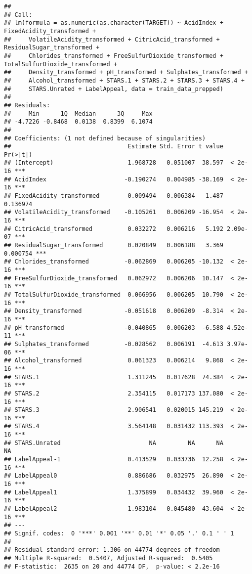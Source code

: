 \documentclass[
]{article}
\begin{document}
\begin{verbatim}
## 
## Call:
## lm(formula = as.numeric(as.character(TARGET)) ~ AcidIndex + FixedAcidity_transformed + 
##     VolatileAcidity_transformed + CitricAcid_transformed + ResidualSugar_transformed + 
##     Chlorides_transformed + FreeSulfurDioxide_transformed + TotalSulfurDioxide_transformed + 
##     Density_transformed + pH_transformed + Sulphates_transformed + 
##     Alcohol_transformed + STARS.1 + STARS.2 + STARS.3 + STARS.4 + 
##     STARS.Unrated + LabelAppeal, data = train_data_prepped)
## 
## Residuals:
##     Min      1Q  Median      3Q     Max 
## -4.7226 -0.8468  0.0138  0.8399  6.1074 
## 
## Coefficients: (1 not defined because of singularities)
##                                 Estimate Std. Error t value Pr(>|t|)    
## (Intercept)                     1.968728   0.051007  38.597  < 2e-16 ***
## AcidIndex                      -0.190274   0.004985 -38.169  < 2e-16 ***
## FixedAcidity_transformed        0.009494   0.006384   1.487 0.136974    
## VolatileAcidity_transformed    -0.105261   0.006209 -16.954  < 2e-16 ***
## CitricAcid_transformed          0.032272   0.006216   5.192 2.09e-07 ***
## ResidualSugar_transformed       0.020849   0.006188   3.369 0.000754 ***
## Chlorides_transformed          -0.062869   0.006205 -10.132  < 2e-16 ***
## FreeSulfurDioxide_transformed   0.062972   0.006206  10.147  < 2e-16 ***
## TotalSulfurDioxide_transformed  0.066956   0.006205  10.790  < 2e-16 ***
## Density_transformed            -0.051618   0.006209  -8.314  < 2e-16 ***
## pH_transformed                 -0.040865   0.006203  -6.588 4.52e-11 ***
## Sulphates_transformed          -0.028562   0.006191  -4.613 3.97e-06 ***
## Alcohol_transformed             0.061323   0.006214   9.868  < 2e-16 ***
## STARS.1                         1.311245   0.017628  74.384  < 2e-16 ***
## STARS.2                         2.354115   0.017173 137.080  < 2e-16 ***
## STARS.3                         2.906541   0.020015 145.219  < 2e-16 ***
## STARS.4                         3.564148   0.031432 113.393  < 2e-16 ***
## STARS.Unrated                         NA         NA      NA       NA    
## LabelAppeal-1                   0.413529   0.033736  12.258  < 2e-16 ***
## LabelAppeal0                    0.886686   0.032975  26.890  < 2e-16 ***
## LabelAppeal1                    1.375899   0.034432  39.960  < 2e-16 ***
## LabelAppeal2                    1.983104   0.045480  43.604  < 2e-16 ***
## ---
## Signif. codes:  0 '***' 0.001 '**' 0.01 '*' 0.05 '.' 0.1 ' ' 1
## 
## Residual standard error: 1.306 on 44774 degrees of freedom
## Multiple R-squared:  0.5407, Adjusted R-squared:  0.5405 
## F-statistic:  2635 on 20 and 44774 DF,  p-value: < 2.2e-16
\end{verbatim}
\end{document}
